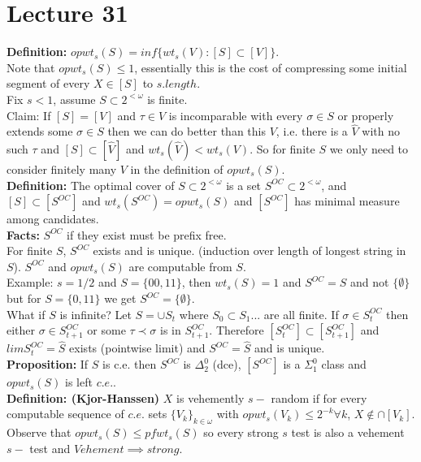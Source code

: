 \documentclass{article}
\begin{document}
  \section{Lecture 31}
  \textbf{Definition:} $opwt_s(S) = inf \{wt_s(V) : [S] \subset [V]\}$.
  \\ Note that $opwt_s(S) \leq 1$, essentially this is the cost of compressing some initial segment of every $X \in [S]$ to $s. length$.\\
  Fix $s< 1$, assume $S\subset 2^{<\omega}$ is finite. \\
  Claim: If $[S] = [V]$ and $\tau \in V$ is incomparable with every $\sigma \in S$ or properly extends some $\sigma\in S$ then we can do better than this $V$, i.e. there is a $\hat V $ with no such $\tau$ and $[S] \subset [\hat  V]$ and $wt_s(\hat V )< wt_s(V)$. So for finite $S$ we only need to consider finitely many $V$ in the definition of $opwt_s(S)$. \\
  \textbf{Definition:} The optimal cover of $S \subset 2^{<\omega}$ is a set $S^{OC}\subset 2^{<\omega}$, and $[S] \subset [S^{OC}]$ and $wt_s(S^{OC}) = opwt_s(S)$ and $[S^{OC}]$ has minimal measure among candidates. \\
  \textbf{Facts:} $S^{OC}$ if they exist must be prefix free. \\For finite $S$, $S^{OC}$ exists and is unique. (induction over length of longest string in $S$).
  $S^{OC}$ and $opwt_s(S)$ are computable from $S$.\\
  Example: $s=1/2$ and $S = \{00,11\}$, then $wt_s(S) = 1$ and $S^{OC} = S$ and not $\{\emptyset\}$ but for $S = \{0,11\}$ we get $S^{OC} = \{\emptyset\}$.\\
  What if $S$ is infinite? Let $S = \cup S_t$ where $S_0 \subset S_1 ...$ are all finite. If $\sigma \in S_t^{OC}$ then either $\sigma \in S^{OC}_{t+1}$ or some $\tau \prec \sigma$ is in $S^{OC}_{t+1}$. Therefore $[S_t^{OC}] \subset [S_{t+1}^{OC}]$ and $lim S_t^{OC} = \hat S$ exists (pointwise limit) and $S^{OC} = \hat {S}$ and is unique.\\
  \textbf{Proposition:} If $S$ is c.e. then $S^{OC}$ is $\Delta^0_2$ (dce), $[S^{OC}]$ is a $\Sigma^0_1$ class and $opwt_s(S)$ is left $c.e.$.\\
  \textbf{Definition: (Kjor-Hanssen)} $X$ is vehemently $s-$ random if for every computable sequence of $c.e.$ sets $\{V_k\}_{k \in \omega}$ with $opwt_s(V_k) \leq 2^{-k} \forall k$, $X \not \in \cap [V_k]$.
  Observe that $opwt_s(S) \leq pfwt_s(S)$ so every strong $s$ test is also a vehement $s-$ test and $Vehement \implies strong$.\\
\end{document}
